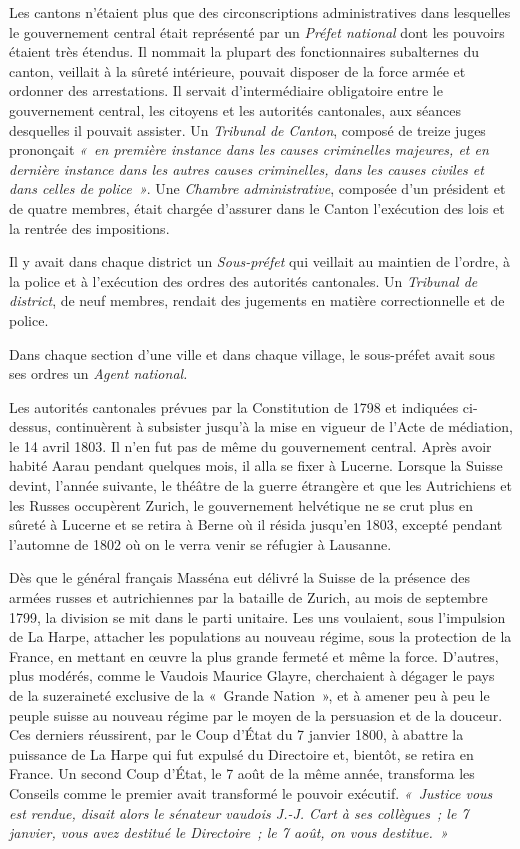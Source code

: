 \documentclass[french,twoside]{book} %
\begin{document}
Les cantons n’étaient plus que des circonscriptions administratives dans lesquelles le gouvernement central était représenté par un \emph{Préfet national} dont les pouvoirs étaient très étendus. Il nommait la plupart des fonctionnaires subalternes du canton, veillait à la sûreté intérieure, pouvait disposer de la force armée et ordonner des arrestations. Il servait d’intermédiaire obligatoire entre le gouvernement central, les citoyens et les autorités cantonales, aux séances desquelles il pouvait assister. Un \emph{Tribunal de Canton}, composé de treize juges prononçait \emph{« en première instance dans les causes criminelles majeures, et en dernière instance dans les autres causes criminelles, dans les causes civiles et dans celles de police »}. Une \emph{Chambre administrative}, composée d’un président et de quatre membres, était chargée d’assurer dans le Canton l’exécution des lois et la rentrée des impositions.\par
Il y avait dans chaque district un \emph{Sous-préfet} qui veillait au maintien de l’ordre, à la police et à l’exécution des ordres des autorités cantonales. Un \emph{Tribunal de district}, de neuf membres, rendait des jugements en matière correctionnelle et de police.\par
Dans chaque section d’une ville et dans chaque village, le sous-préfet avait sous ses ordres un \emph{Agent national.}\par
Les autorités cantonales prévues par la Constitution de 1798 et indiquées ci-dessus, continuèrent à subsister jusqu’à la mise en vigueur de l’Acte de médiation, le 14 avril 1803. Il n’en fut pas de même du gouvernement central. Après avoir habité Aarau pendant quelques mois, il alla se fixer à Lucerne. Lorsque la Suisse devint, l’année suivante, le théâtre de la guerre étrangère et que les Autrichiens et les Russes occupèrent Zurich, le gouvernement helvétique ne se crut plus en sûreté à Lucerne et se retira à Berne où il résida jusqu’en 1803, excepté pendant l’automne de 1802 où on le verra venir se réfugier à Lausanne.\par
Dès que le général français Masséna eut délivré la Suisse de la présence des armées russes et autrichiennes par la bataille de Zurich, au mois de septembre 1799, la division se mit dans le parti unitaire. Les uns voulaient, sous l’impulsion de La Harpe, attacher les populations au nouveau régime, sous la protection de la France, en mettant en œuvre la plus grande fermeté et même la force. D’autres, plus modérés, comme le Vaudois Maurice Glayre, cherchaient à dégager le pays de la suzeraineté exclusive de la « Grande Nation », et à amener peu à peu le peuple suisse au nouveau régime par le moyen de la persuasion et de la douceur. Ces derniers réussirent, par le Coup d’État du 7 janvier 1800, à abattre la puissance de La Harpe qui fut expulsé du Directoire et, bientôt, se retira en France. Un second Coup d’État, le 7 août de la même année, transforma les Conseils comme le premier avait transformé le pouvoir exécutif. \emph{« Justice vous est rendue, disait alors le sénateur vaudois J.-J. Cart à ses collègues ; le 7 janvier, vous avez destitué le Directoire ; le 7 août, on vous destitue. »}\par
\end{document}
